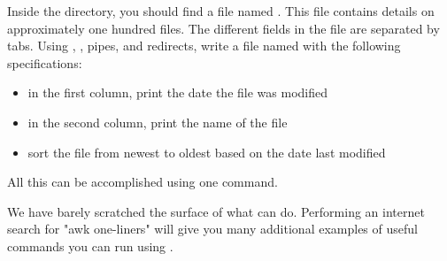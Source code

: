 \begin{problem}
Inside the  directory, you should find a file named .
This file contains details on approximately one hundred files.
The different fields in the file are separated by tabs.
Using , , pipes, and redirects, write a file named  with the following specifications:
\begin{itemize}
\item in the first column, print the date the file was modified
\item in the second column, print the name of the file
\item sort the file from newest to oldest based on the date last modified
\end{itemize}
All this can be accomplished using one command.
\end{problem}

We have barely scratched the surface of what  can do.
Performing an internet search for "awk one-liners" will give you many additional examples of useful commands you can run using . 

\begin{comment}
\section*{One Final Note}
Though there are multiple Unix shells, one of the most popular is the \emph{bash} shell.
The bash shell is highly customizeable.
In your home directory, you will find a hidden file named \li{.bashrc}.
All customization changes are saved in this file.
If you are interested in customizing your shell, you can customize the prompt using the \li{PS1} environment variable.
As you become more and more familiar with the Unix shell, you will come to find there are commands you run over and over again.
You can save commands you use frequently using \li{alias}.
If you would like more information on these and other ways to customize the shell, you can find many quality reference guides and tutorials on the internet.
\end{comment}
 
